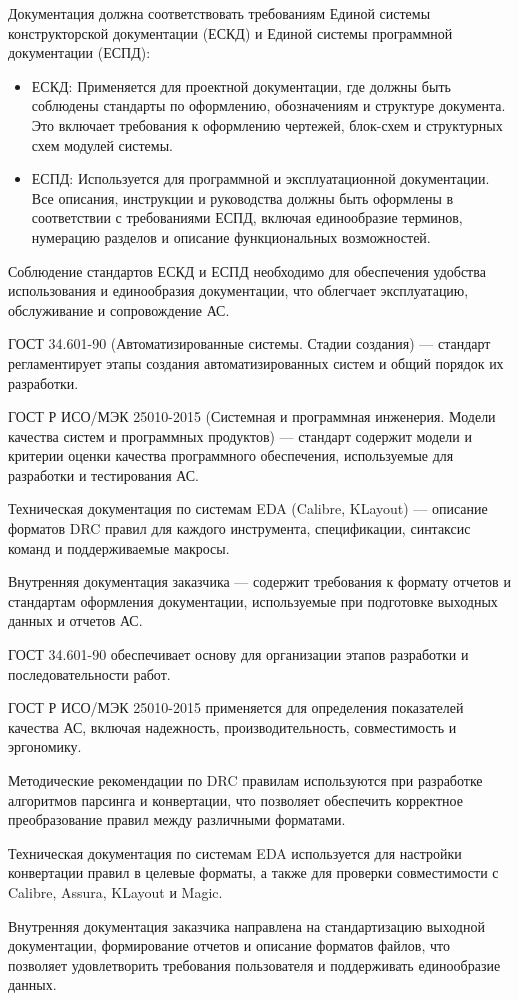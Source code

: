 Документация должна соответствовать требованиям
Единой системы конструкторской документации (ЕСКД)
и Единой системы программной документации (ЕСПД):

\begin{itemize}
	\item ЕСКД: Применяется для проектной документации,
		где должны быть соблюдены стандарты по оформлению, обозначениям
		и структуре документа.
		Это включает требования к оформлению чертежей,
		блок-схем и структурных схем модулей системы.
	\item ЕСПД: Используется для программной и эксплуатационной документации.
		Все описания, инструкции и руководства должны быть оформлены
		в соответствии с требованиями ЕСПД, включая единообразие терминов,
		нумерацию разделов и описание функциональных возможностей.
\end{itemize}

Соблюдение стандартов ЕСКД и ЕСПД необходимо
для обеспечения удобства использования и единообразия документации,
что облегчает эксплуатацию, обслуживание и сопровождение АС.



ГОСТ 34.601-90 (Автоматизированные системы. Стадии создания)
--- стандарт регламентирует этапы создания автоматизированных систем
и общий порядок их разработки.

ГОСТ Р ИСО/МЭК 25010-2015 (Системная и программная инженерия.
Модели качества систем и программных продуктов) --- стандарт содержит модели
и критерии оценки качества программного обеспечения,
используемые для разработки и тестирования АС.

Техническая документация по системам EDA (Calibre, KLayout)
--- описание форматов DRC правил для каждого инструмента,
спецификации, синтаксис команд и поддерживаемые макросы.

Внутренняя документация заказчика --- содержит требования к формату отчетов
и стандартам оформления документации,
используемые при подготовке выходных данных и отчетов АС.


ГОСТ 34.601-90 обеспечивает основу для организации этапов разработки
и последовательности работ.

ГОСТ Р ИСО/МЭК 25010-2015 применяется
для определения показателей качества АС, включая надежность,
производительность, совместимость и эргономику.

Методические рекомендации по DRC правилам используются
при разработке алгоритмов парсинга и конвертации,
что позволяет обеспечить корректное преобразование правил
между различными форматами.

Техническая документация по системам EDA используется
для настройки конвертации правил в целевые форматы,
а также для проверки совместимости с Calibre, Assura, KLayout и Magic.

Внутренняя документация заказчика направлена
на стандартизацию выходной документации,
формирование отчетов и описание форматов файлов,
что позволяет удовлетворить требования пользователя
и поддерживать единообразие данных.

